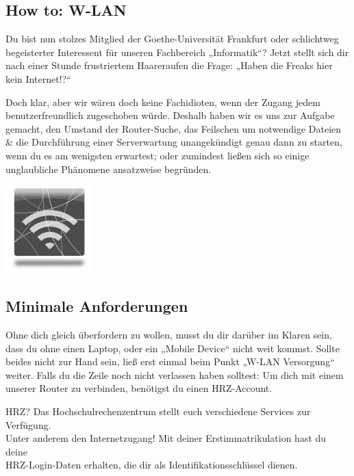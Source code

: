 \subsection*{How to: W-LAN}

Du bist nun stolzes Mitglied der Goethe-Universität Frankfurt oder schlichtweg begeisterter Interessent für unseren
Fachbereich „Informatik“? Jetzt stellt sich dir nach einer Stunde frustriertem Haareraufen die Frage: „Haben die Freaks
hier kein Internet!?“

Doch klar, aber wir wären doch keine Fachidioten, wenn der Zugang jedem benutzerfreundlich
zugeschoben würde. Deshalb haben wir es uns zur Aufgabe gemacht, den Umstand der Router-Suche, das Feilschen um
notwendige Dateien \& die Durchführung einer Serverwartung unangekündigt genau dann zu starten, wenn du es am wenigsten
erwartest; oder zumindest ließen sich so einige unglaubliche Phänomene ansatzweise begründen.

\begin{center}
	\includegraphics{bitmaps/network-wlan-icon}
\end{center}
\vspace{-5mm}

\subsection*{Minimale Anforderungen}

Ohne dich gleich überfordern zu wollen, musst du dir darüber im Klaren sein, dass du ohne einen Laptop, oder ein „Mobile
Device“ nicht weit kommst. Sollte beides nicht zur Hand sein, ließ erst einmal beim Punkt „W-LAN Versorgung“ weiter.
Falls du die Zeile noch nicht verlassen haben solltest: Um dich mit einem unserer Router zu verbinden, benötigst du
einen HRZ-Account.

\begin{fancyblock}{HRZ?}
	Das Hochschulrechenzentrum stellt euch verschiedene Services zur Verfügung.\\
	Unter anderem den Internetzugang! Mit deiner Erstimmatrikulation hast du deine\\
	HRZ-Login-Daten erhalten, die dir als Identifikationsschlüssel dienen.
\end{fancyblock}

